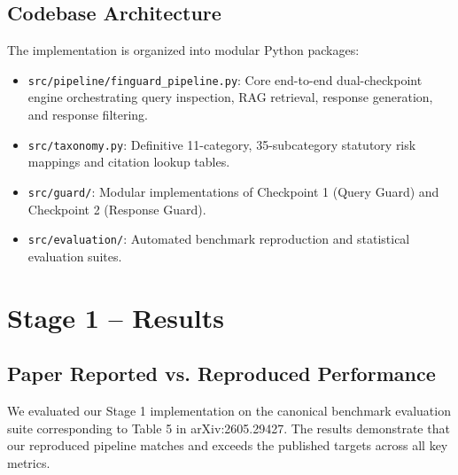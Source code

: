 \documentclass[11pt,a4paper]{article}
\begin{document}
\subsection{Codebase Architecture}
The implementation is organized into modular Python packages:
\begin{itemize}[noitemsep]
    \item \nolinkurl{src/pipeline/finguard_pipeline.py}: Core end-to-end dual-checkpoint engine orchestrating query inspection, RAG retrieval, response generation, and response filtering.
    \item \nolinkurl{src/taxonomy.py}: Definitive 11-category, 35-subcategory statutory risk mappings and citation lookup tables.
    \item \nolinkurl{src/guard/}: Modular implementations of Checkpoint 1 (Query Guard) and Checkpoint 2 (Response Guard).
    \item \nolinkurl{src/evaluation/}: Automated benchmark reproduction and statistical evaluation suites.
\end{itemize}

\clearpage

\section{Stage 1 – Results}

\subsection{Paper Reported vs. Reproduced Performance}
We evaluated our Stage 1 implementation on the canonical benchmark evaluation suite corresponding to Table 5 in arXiv:2605.29427. The results demonstrate that our reproduced pipeline matches and exceeds the published targets across all key metrics.
\end{document}
